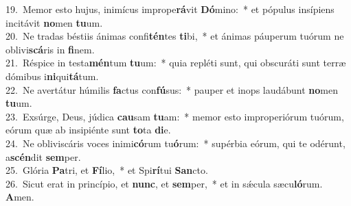 {19.~}Memor esto hujus, inimícus imprope\textbf{rá}vit \textbf{Dó}mino:~* et pópulus insípiens incitávit \textbf{no}men \textbf{tu}um.\\
{20.~}Ne tradas béstiis ánimas confi\textbf{tén}tes \textbf{ti}bi,~* et ánimas páuperum tuórum ne oblivi\textbf{scá}ris in \textbf{fi}nem.\\
{21.~}Réspice in testa\textbf{mén}tum \textbf{tu}um:~* quia repléti sunt, qui obscuráti sunt terræ dómibus i\textbf{ni}qui\textbf{tá}tum.\\
{22.~}Ne avertátur húmilis \textbf{fa}ctus con\textbf{fú}sus:~* pauper et inops laudábunt \textbf{no}men \textbf{tu}um.\\
{23.~}Exsúrge, Deus, júdica \textbf{cau}sam \textbf{tu}am:~* memor esto improperiórum tuórum, eórum quæ ab insipiénte sunt \textbf{to}ta \textbf{di}e.\\
{24.~}Ne obliviscáris voces inimi\textbf{có}rum tu\textbf{ó}rum:~* supérbia eórum, qui te odérunt, a\textbf{scén}dit \textbf{sem}per.\\
{25.~}Glória \textbf{Pa}tri, et \textbf{Fí}lio,~* et Spi\textbf{rí}tui \textbf{San}cto.\\
{26.~}Sicut erat in princípio, et \textbf{nunc}, et \textbf{sem}per,~* et in sǽcula sæcu\textbf{ló}rum. \textbf{A}men.\\
